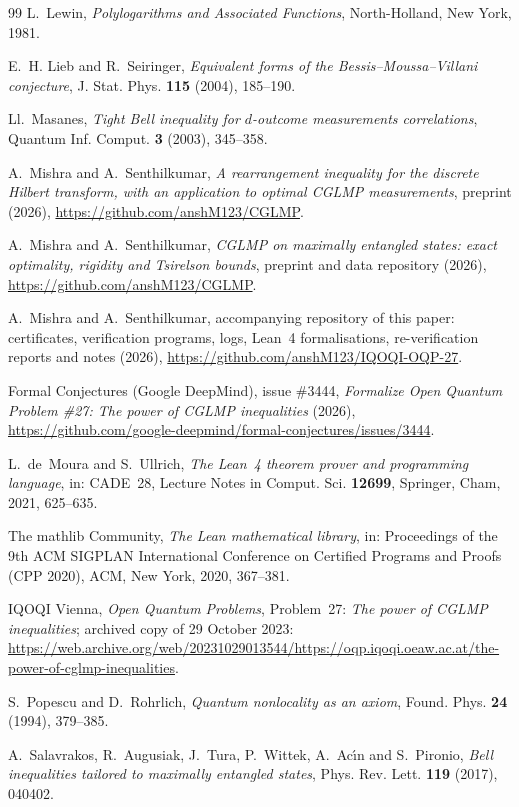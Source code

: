 \documentclass[11pt]{amsart}
\theoremstyle{definition}
\theoremstyle{remark}
\numberwithin{equation}{section}
\begin{document}
\begin{thebibliography}{99}
L.~Lewin, \emph{Polylogarithms and Associated Functions}, North-Holland, New York, 1981.

E.~H. Lieb and R.~Seiringer, \emph{Equivalent forms of the Bessis--Moussa--Villani conjecture}, J. Stat. Phys.
\textbf{115} (2004), 185--190.

Ll.~Masanes, \emph{Tight Bell inequality for $d$-outcome measurements correlations}, Quantum Inf. Comput. \textbf{3}
(2003), 345--358.

A.~Mishra and A.~Senthilkumar, \emph{A rearrangement inequality for the discrete Hilbert transform, with an application to
optimal CGLMP measurements}, preprint (2026), \url{https://github.com/anshM123/CGLMP}.

A.~Mishra and A.~Senthilkumar, \emph{CGLMP on maximally entangled states: exact optimality, rigidity and Tsirelson
bounds}, preprint and data repository (2026), \url{https://github.com/anshM123/CGLMP}.

A.~Mishra and A.~Senthilkumar, accompanying repository of this paper: certificates, verification programs, logs, Lean~4
formalisations, re-verification reports and notes (2026),
\url{https://github.com/anshM123/IQOQI-OQP-27}.

Formal Conjectures (Google DeepMind), issue \#3444, \emph{Formalize Open Quantum Problem \#27: The power of CGLMP
inequalities} (2026), \url{https://github.com/google-deepmind/formal-conjectures/issues/3444}.

L.~de~Moura and S.~Ullrich, \emph{The Lean~4 theorem prover and programming language}, in: CADE~28, Lecture Notes in
Comput. Sci. \textbf{12699}, Springer, Cham, 2021, 625--635.

The mathlib Community, \emph{The Lean mathematical library}, in: Proceedings of the 9th ACM SIGPLAN International
Conference on Certified Programs and Proofs (CPP 2020), ACM, New York, 2020, 367--381.

IQOQI Vienna, \emph{Open Quantum Problems}, Problem~27: \emph{The power of CGLMP inequalities}; archived copy of 29 October
2023:
\url{https://web.archive.org/web/20231029013544/https://oqp.iqoqi.oeaw.ac.at/the-power-of-cglmp-inequalities}.

S.~Popescu and D.~Rohrlich, \emph{Quantum nonlocality as an axiom}, Found. Phys. \textbf{24} (1994), 379--385.

A.~Salavrakos, R.~Augusiak, J.~Tura, P.~Wittek, A.~Ac\'{\i}n and S.~Pironio, \emph{Bell inequalities tailored to maximally
entangled states}, Phys. Rev. Lett. \textbf{119} (2017), 040402.


\end{thebibliography}
\end{document}
